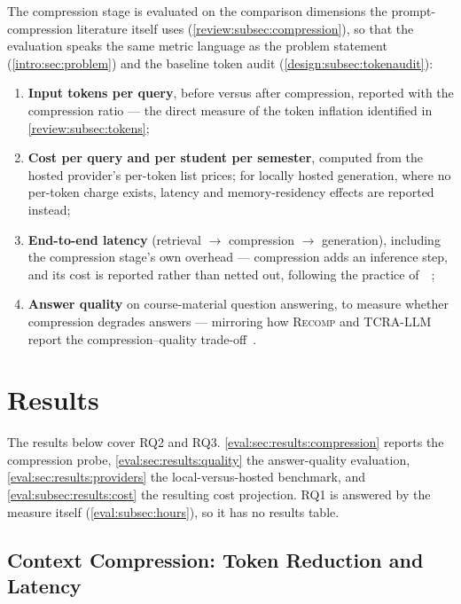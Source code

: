 The compression stage is evaluated on the comparison dimensions the
prompt-compression literature itself uses
(\autoref{review:subsec:compression}), so that the evaluation speaks the same
metric language as the problem statement
(\autoref{intro:sec:problem}) and the baseline token audit
(\autoref{design:subsec:tokenaudit}):

\begin{enumerate}[nosep]
  \item \textbf{Input tokens per query}, before versus after compression,
        reported with the compression ratio --- the direct measure of the
        token inflation identified in \autoref{review:subsec:tokens};
  \item \textbf{Cost per query and per student per semester}, computed from
        the hosted provider's per-token list prices; for locally hosted
        generation, where no per-token charge exists, latency and
        memory-residency effects are reported instead;
  \item \textbf{End-to-end latency} (retrieval $\rightarrow$ compression
        $\rightarrow$ generation), including the compression stage's own
        overhead --- compression adds an inference step, and its cost is
        reported rather than netted out, following the practice
        of~\citet{facl25:Jeong}~\cite{facl25:Jeong};
  \item \textbf{Answer quality} on course-material question answering, to
        measure whether compression degrades answers --- mirroring how
        \textsc{Recomp} and TCRA-LLM report the compression--quality
        trade-off~\cite{iclr24:Xu, femnlp23:Liu}.
\end{enumerate}

\section{Results}
\label{eval:sec:results}

The results below cover RQ2 and RQ3. \autoref{eval:sec:results:compression}
reports the compression probe, \autoref{eval:sec:results:quality} the
answer-quality evaluation, \autoref{eval:sec:results:providers} the
local-versus-hosted benchmark, and \autoref{eval:subsec:results:cost} the
resulting cost projection. RQ1 is answered by the measure itself
(\autoref{eval:subsec:hours}), so it has no results table.

\subsection{Context Compression: Token Reduction and Latency}
\label{eval:sec:results:compression}

